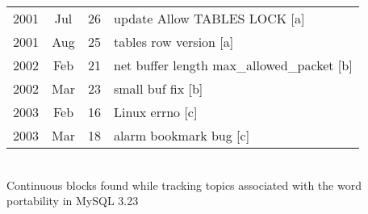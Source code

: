 \documentclass[titlepage,usenames,a4,landscape,semhelv,16pt]{seminar}
\begin{document}
\begin{slide}
\begin{itemize}
\begin{itemize}
\newslide

\begin{specquotef}
\centering
\begin{tabular}{|ccc|l|}

\hline
2001 &	Jul &	26 &		update Allow TABLES LOCK [a] \\ 

2001 &	Aug &	25 &		tables row version [a] \\
\hline
\hline
2002 &	Feb &	21 &		net buffer length	max\_allowed\_packet [b] \\
2002 &	Mar &	23 &		small buf fix [b]	\\
\hline
\hline
2003 &	Feb &	16 &		Linux errno	[c] \\
2003 &	Mar &	18 &		alarm bookmark bug [c] \\
\hline
\end{tabular} \\
{Continuous blocks found while tracking topics associated with the word portability in MySQL 3.23}
\label{tab:portability}
\end{specquotef}

\newslide



\end{itemize}
\end{itemize}
\end{slide}
\end{document}
